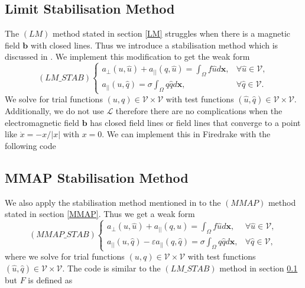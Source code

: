 \documentclass[12pt]{ociamthesis}
\begin{document}
\subsection{Limit Stabilisation Method} \label{LM_STAB}
The $(LM)$ method stated in section \ref{LM} struggles when there is a magnetic field $\mathbf{b}$ with closed lines. Thus we introduce a stabilisation method which is discussed in \cite{STAB}. We implement this modification to get the weak form
\begin{equation} \label{LM_STAB_w}
(LM\_STAB)
\begin{cases}
a_{\perp}(u, \hat{u}) + a_{||}(q, \hat{u}) = \int_{\Omega} f \hat{u} d\mathbf{x}, 
&\forall \hat{u} \in \mathcal{V},\\
a_{||}(u, \hat{q}) = \sigma \int_{\Omega} q \hat{q} d\mathbf{x}, & \forall \hat{q} \in \mathcal{V}.
\end{cases}
\end{equation}
We solve for trial functions $(u, q) \in \mathcal{V} \times \mathcal{V}$ with test functions $(\hat{u}, \hat{q}) \in \mathcal{V} \times \mathcal{V}$. Additionally, we do not use $\mathcal{L}$ therefore there are no complications when the electromagnetic field $\mathbf{b}$ has closed field lines or field lines that converge to a point like $\dot{x} = -x/|x|$ with $x=0$.
We can implement this in Firedrake \cite{Dragon} with the following code


\subsection{MMAP Stabilisation Method} \label{MMAP_STAB}
We also apply the stabilisation method mentioned in \cite{STAB} to the $(MMAP)$ method stated in section \ref{MMAP}. Thus we get a weak form
\begin{equation} \label{MMAP_STAB_w}
(MMAP\_STAB)
\begin{cases}
a_{\perp}(u, \hat{u}) + a_{||}(q, \hat{u}) = \int_{\Omega} f \hat{u} d\mathbf{x}, 
&\forall \hat{u} \in \mathcal{V},\\
a_{||}(u, \hat{q}) - \varepsilon a_{||}(q, \hat{q}) = \sigma \int_{\Omega} q \hat{q} d\mathbf{x}, & \forall \hat{q}\in \mathcal{V},
\end{cases}
\end{equation}
where we solve for trial functions $(u,q) \in \mathcal{V} \times \mathcal{V}$ with test functions $(\hat{u}, \hat{q}) \in \mathcal{V} \times \mathcal{V}$. The code is similar to the $(LM\_STAB)$ method in section \ref{LM_STAB} but $F$ is defined as

\end{document}

